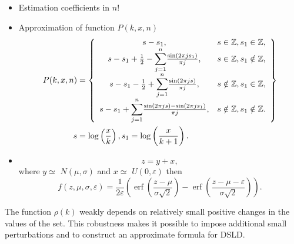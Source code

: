 \documentclass[titlepage,fleqn]{article}%
\providecommand{\U}[1]{\protect\rule{.1in}{.1in}}
\begin{document}
\begin{itemize}
\item Estimation coefficients in $n!$

\item Approximation of function $P(k,x,n)$
\begin{align}
P(k,x,n)  &  =\left\{
\begin{array}
[c]{cc}%
s-s_{1}, & s\in%
\mathbb{Z}
,s_{1}\in%
\mathbb{Z}
,\\
s-s_{1}+\frac{1}{2}-%
{\displaystyle\sum\limits_{j=1}^{n}}
\frac{\sin(2\pi js_{1})}{\pi j}, & s\in%
\mathbb{Z}
,s_{1}\notin%
\mathbb{Z}
,\\
s-s_{1}-\frac{1}{2}+%
{\displaystyle\sum\limits_{j=1}^{n}}
\frac{\sin(2\pi js)}{\pi j}, & s\notin%
\mathbb{Z}
,s_{1}\in%
\mathbb{Z}
,\\
s-s_{1}+%
{\displaystyle\sum\limits_{j=1}^{n}}
\frac{\sin(2\pi js)-\sin(2\pi js_{1})}{\pi j}, & s\notin%
\mathbb{Z}
,s_{1}\notin%
\mathbb{Z}
.
\end{array}
\right\} \label{RHOa}\\
s  &  =\log\left(  \frac{x}{k}\right)  ,s_{1}=\log\left(  \frac{x}%
{k+1}\right)  .\nonumber
\end{align}


\item
\[
z=y+x,
\]
where $y\simeq$ $N(\mu,\sigma)$ and $x\simeq$ $U(0,\varepsilon)$ then%
\[
f(z,\mu,\sigma,\varepsilon)=\frac{1}{2\varepsilon}\left(  \operatorname{erf}%
\left(  \frac{z-\mu}{\sigma\sqrt{2}}\right)  -\operatorname{erf}\left(
\frac{z-\mu-\varepsilon}{\sigma\sqrt{2}}\right)  \right)  .
\]

\end{itemize}

The function $\rho(k)$ weakly depends on relatively small positive changes in
the values of the set. This robustness makes it possible to impose additional
small perturbations and to construct an approximate formula for DSLD.
\end{document}
